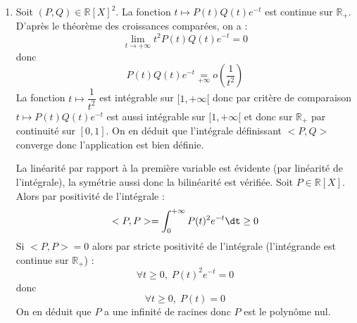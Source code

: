 \documentclass[a4paper,10pt]{report}
\begin{document}
\begin{enumerate}
\item Soit $(P,Q) \in \mathbb{R}[X]^2$. La fonction $t \mapsto P(t)Q(t)e^{-t}$ est continue sur $\mathbb{R}_+$. D'après le théorème des croissances comparées, on a :
$$ \lim_{t \rightarrow + \infty} t^2P(t)Q(t) e^{-t} = 0$$
donc 
$$ P(t)Q(t) e^{-t} \underset{+ \infty}{=} o \left( \dfrac{1}{t^2} \right)$$
La fonction $t \mapsto \dfrac{1}{t^2}$ est intégrable sur $[1, + \infty[$ donc par critère de comparaison $t \mapsto P(t)Q(t)e^{-t}$ est aussi intégrable sur $[1, + \infty[$ et donc sur $\mathbb{R}_+$ par continuité sur $[0,1]$. On en déduit que l'intégrale définissant $<P,Q>$ converge donc l'application est bien définie.

\medskip

\noindent La linéarité par rapport à la première variable est évidente (par linéarité de l'intégrale), la symétrie aussi donc la bilinéarité est vérifiée. Soit $P \in \mathbb{R}[X]$. Alors par positivité de l'intégrale :
$$ <P,P> = \int_0^{+ \infty} P(t)^2 e^{-t} \dt \geq 0$$
Si $<P,P>=0$ alors par stricte positivité de l'intégrale (l'intégrande est continue sur $\mathbb{R}_+$) :
$$ \forall t \geq 0, \; P(t)^2 e^{-t} = 0$$
donc
$$ \forall t \geq 0, \; P(t)=0$$
On en déduit que $P$ a une infinité de racines donc $P$ est le polynôme nul.

\medskip


\end{enumerate}
\end{document}
